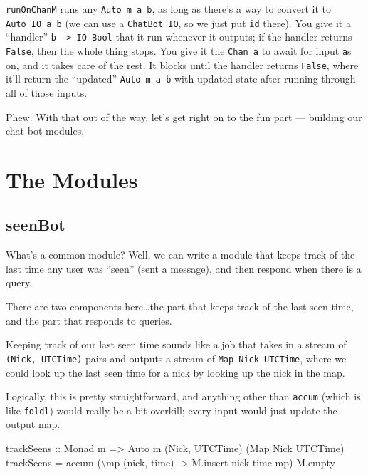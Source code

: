 \documentclass[]{article}
\newenvironment{Shaded}{}{}
\newcommand{\DataTypeTok}[1]{\textcolor[rgb]{0.56,0.13,0.00}{{#1}}}
\newcommand{\OtherTok}[1]{\textcolor[rgb]{0.00,0.44,0.13}{{#1}}}
\newcommand{\FunctionTok}[1]{\textcolor[rgb]{0.02,0.16,0.49}{{#1}}}
\newcommand{\NormalTok}[1]{{#1}}
\begin{document}
\texttt{runOnChanM} runs any \texttt{Auto\ m\ a\ b}, as long as there's a way to
convert it to \texttt{Auto\ IO\ a\ b} (we can use a \texttt{ChatBot\ IO}, so we
just put \texttt{id} there). You give it a ``handler''
\texttt{b\ -\textgreater{}\ IO\ Bool} that it run whenever it outputs; if the
handler returns \texttt{False}, then the whole thing stops. You give it the
\texttt{Chan\ a} to await for input \texttt{a}s on, and it takes care of the
rest. It blocks until the handler returns \texttt{False}, where it'll return the
``updated'' \texttt{Auto\ m\ a\ b} with updated state after running through all
of those inputs.

Phew. With that out of the way, let's get right on to the fun part --- building
our chat bot modules.

\section{The Modules}\label{the-modules}

\subsection{seenBot}\label{seenbot}

What's a common module? Well, we can write a module that keeps track of the last
time any user was ``seen'' (sent a message), and then respond when there is a
query.

There are two components here\ldots{}the part that keeps track of the last seen
time, and the part that responds to queries.

Keeping track of our last seen time sounds like a job that takes in a stream of
\texttt{(Nick,\ UTCTime)} pairs and outputs a stream of
\texttt{Map\ Nick\ UTCTime}, where we could look up the last seen time for a
nick by looking up the nick in the map.

Logically, this is pretty straightforward, and anything other than
\texttt{accum} (which is like \texttt{foldl\textquotesingle{}}) would really be
a bit overkill; every input would just update the output map.

\begin{Shaded}
\begin{Highlighting}[]
\OtherTok{trackSeens ::} \DataTypeTok{Monad} \NormalTok{m }\OtherTok{=>} \DataTypeTok{Auto} \NormalTok{m (}\DataTypeTok{Nick}\NormalTok{, }\DataTypeTok{UTCTime}\NormalTok{) (}\DataTypeTok{Map} \DataTypeTok{Nick} \DataTypeTok{UTCTime}\NormalTok{)}
\NormalTok{trackSeens }\FunctionTok{=} \NormalTok{accum (\textbackslash{}mp (nick, time) }\OtherTok{->} \NormalTok{M.insert nick time mp) M.empty}
\end{Highlighting}
\end{Shaded}
\end{document}
